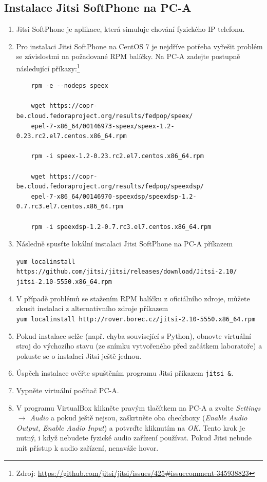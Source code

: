 \subsection{Instalace Jitsi SoftPhone na PC-A}
\begin{enumerate}
  \item Jitsi SoftPhone je aplikace, která simuluje chování fyzického IP telefonu.
  
  \item Pro instalaci Jitsi SoftPhone na CentOS 7 je nejdříve potřeba vyřešit problém se závislostmi na požadované RPM balíčky. Na PC-A zadejte postupně následující příkazy:\footnote{Zdroj: \url{https://github.com/jitsi/jitsi/issues/425#issuecomment-345938823}}
      
	\begin{verbatim}
	rpm -e --nodeps speex
	
	wget https://copr-be.cloud.fedoraproject.org/results/fedpop/speex/
	epel-7-x86_64/00146973-speex/speex-1.2-0.23.rc2.el7.centos.x86_64.rpm
	
	rpm -i speex-1.2-0.23.rc2.el7.centos.x86_64.rpm
	
	wget https://copr-be.cloud.fedoraproject.org/results/fedpop/speexdsp/
	epel-7-x86_64/00146970-speexdsp/speexdsp-1.2-0.7.rc3.el7.centos.x86_64.rpm
	
	rpm -i speexdsp-1.2-0.7.rc3.el7.centos.x86_64.rpm
	\end{verbatim}
	
  \item Následně spusťte lokální instalaci Jitsi SoftPhone na PC-A příkazem
  
  \verb{yum localinstall https://github.com/jitsi/jitsi/releases/download/Jitsi-2.10/{\\
  \verb{jitsi-2.10-5550.x86_64.rpm{
  
  \item V případě problémů se stažením RPM balíčku z oficiálního zdroje, můžete zkusit instalaci z alternativního zdroje příkazem\\
  \verb{yum localinstall http://rover.borec.cz/jitsi-2.10-5550.x86_64.rpm{
  
  \item Pokud instalace selže (např. chyba související s Python), obnovte virtuální stroj do výchozího stavu (ze snímku vytvořeného před začátkem laboratoře) a pokuste se o instalaci Jitsi ještě jednou.
  
  \item Úspěch instalace ověřte spuštěním programu Jitsi příkazem \texttt{jitsi \&}.
  
  \item Vypněte virtuální počítač PC-A.
  
  \item V programu VirtualBox klikněte pravým tlačítkem na PC-A a zvolte \emph{Settings $\rightarrow$ Audio} a pokud ještě nejsou, zaškrtněte oba checkboxy (\emph{Enable Audio Output, Enable Audio Input}) a potvrďte kliknutím na \emph{OK}. Tento krok je nutný, i když nebudete fyzické audio zařízení používat. Pokud Jitsi nebude mít přístup k audio zařízení, nenaváže hovor.
\end{enumerate}
  


